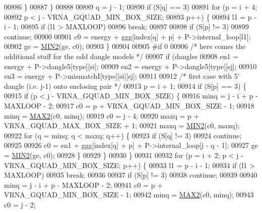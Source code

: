 \begin{DoxyCode}
00886     \}
00887   \}
00888 
00889   q = j - 1;
00890   \textcolor{keywordflow}{if} (S[q] == 3)
00891     \textcolor{keywordflow}{for} (p = i + 4;
00892          p < j - VRNA\_GQUAD\_MIN\_BOX\_SIZE;
00893          p++) \{
00894       l1 = p - i - 1;
00895       \textcolor{keywordflow}{if} (l1 > MAXLOOP)
00896         \textcolor{keywordflow}{break};
00897 
00898       \textcolor{keywordflow}{if} (S[p] != 3)
00899         \textcolor{keywordflow}{continue};
00900 
00901       c0  = energy + ggg[index[q] + p] + P->internal\_loop[l1];
00902       ge  = \hyperlink{group__utils_gae0b9cd0ce090bd69b951aa73e8fa4f7d}{MIN2}(ge, c0);
00903     \}
00904 
00905 \textcolor{preprocessor}{#if 0}
00906   \textcolor{comment}{/* here comes the additional stuff for the odd dangle models */}
00907   \textcolor{keywordflow}{if} (dangles %
00908     en1 = energy + P->dangle5[type][si];
00909     en2 = energy + P->dangle5[type][sj];
00910     en3 = energy + P->mismatchI[type][si][sj];
00911 
00912     \textcolor{comment}{/* first case with 5' dangle (i.e. j-1) onto enclosing pair */}
00913     p = i + 1;
00914     \textcolor{keywordflow}{if} (S[p] == 3) \{
00915       \textcolor{keywordflow}{if} (p < j - VRNA\_GQUAD\_MIN\_BOX\_SIZE) \{
00916         minq  = j - i + p - MAXLOOP - 2;
00917         c0    = p + VRNA\_GQUAD\_MIN\_BOX\_SIZE - 1;
00918         minq  = \hyperlink{group__utils_ga33297b3679c713b0c4d897cd0fe3b122}{MAX2}(c0, minq);
00919         c0    = j - 4;
00920         maxq  = p + VRNA\_GQUAD\_MAX\_BOX\_SIZE + 1;
00921         maxq  = \hyperlink{group__utils_gae0b9cd0ce090bd69b951aa73e8fa4f7d}{MIN2}(c0, maxq);
00922         \textcolor{keywordflow}{for} (q = minq; q < maxq; q++) \{
00923           \textcolor{keywordflow}{if} (S[q] != 3)
00924             \textcolor{keywordflow}{continue};
00925 
00926           c0  = en1 + ggg[index[q] + p] + P->internal\_loop[j - q - 1];
00927           ge  = \hyperlink{group__utils_gae0b9cd0ce090bd69b951aa73e8fa4f7d}{MIN2}(ge, c0);
00928         \}
00929       \}
00930     \}
00931 
00932     \textcolor{keywordflow}{for} (p = i + 2; p < j - VRNA\_GQUAD\_MIN\_BOX\_SIZE; p++) \{
00933       l1 = p - i - 1;
00934       \textcolor{keywordflow}{if} (l1 > MAXLOOP)
00935         \textcolor{keywordflow}{break};
00936 
00937       \textcolor{keywordflow}{if} (S[p] != 3)
00938         \textcolor{keywordflow}{continue};
00939 
00940       minq  = j - i + p - MAXLOOP - 2;
00941       c0    = p + VRNA\_GQUAD\_MIN\_BOX\_SIZE - 1;
00942       minq  = \hyperlink{group__utils_ga33297b3679c713b0c4d897cd0fe3b122}{MAX2}(c0, minq);
00943       c0    = j - 2;

\end{DoxyCode}
